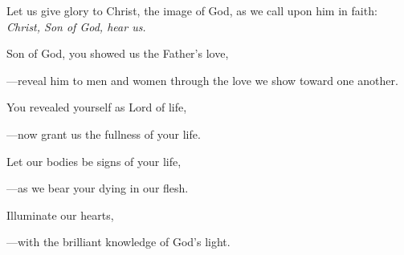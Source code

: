 \intercessions\indent

\begin{hangpar}

Let us give glory to Christ, the image of God, as we call upon him in faith:\\
\emph{Christ, Son of God, hear us.}

\medskip Son of God, you showed us the Father’s love,

{\color{red}---\thinspace}reveal him to men and women through the love we show toward one another.

\medskip You revealed yourself as Lord of life,

{\color{red}---\thinspace}now grant us the fullness of your life.

\medskip Let our bodies be signs of your life,

{\color{red}---\thinspace}as we bear your dying in our flesh.

\medskip Illuminate our hearts,

{\color{red}---\thinspace}with the brilliant knowledge of God’s light.

\medskip

\end{hangpar}